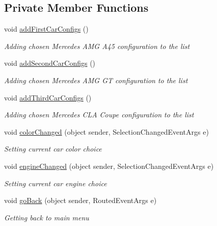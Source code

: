 \subsection*{Private Member Functions}
\begin{DoxyCompactItemize}
\item 
void \mbox{\hyperlink{class_project_app_1_1_cars_configs_a2251c7853e9b5a75da652be6e9ed64bb}{add\+First\+Car\+Configs}} ()
\begin{DoxyCompactList}\small\item\em Adding chosen Mercedes A\+MG A45 configuration to the list \end{DoxyCompactList}\item 
void \mbox{\hyperlink{class_project_app_1_1_cars_configs_a3acec116f90e581d00e596643d810066}{add\+Second\+Car\+Configs}} ()
\begin{DoxyCompactList}\small\item\em Adding chosen Mercedes A\+MG GT configuration to the list \end{DoxyCompactList}\item 
void \mbox{\hyperlink{class_project_app_1_1_cars_configs_ac911bab6817ca08837ff5f88c638d57f}{add\+Third\+Car\+Configs}} ()
\begin{DoxyCompactList}\small\item\em Adding chosen Mercedes C\+LA Coupe configuration to the list \end{DoxyCompactList}\item 
void \mbox{\hyperlink{class_project_app_1_1_cars_configs_a4bcd76012f796c9493f0a0a25a176dc8}{color\+Changed}} (object sender, Selection\+Changed\+Event\+Args e)
\begin{DoxyCompactList}\small\item\em Setting current car color choice \end{DoxyCompactList}\item 
void \mbox{\hyperlink{class_project_app_1_1_cars_configs_a9ab87e077a632aaa4049dc1fb690cbe0}{engine\+Changed}} (object sender, Selection\+Changed\+Event\+Args e)
\begin{DoxyCompactList}\small\item\em Setting current car engine choice \end{DoxyCompactList}\item 
void \mbox{\hyperlink{class_project_app_1_1_cars_configs_a02fb76e569baa27975b4e23456d1b7c0}{go\+Back}} (object sender, Routed\+Event\+Args e)
\begin{DoxyCompactList}\small\item\em Getting back to main menu \end{DoxyCompactList}\item 

\end{DoxyCompactItemize}
